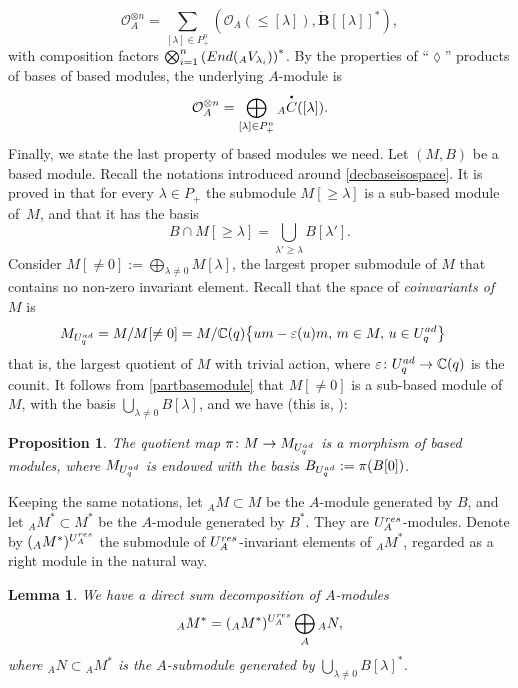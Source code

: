 \documentclass[11pt]{article}
\numberwithin{equation}{section}
\numberwithin{equation}{section}
\newtheorem{lem}[teo]{Lemma}
\newtheorem{prop}[teo]{Proposition}
\theoremstyle{definition}
\newcommand{\mc}{\mathbb{C}}
\newcommand{\Oo}{{\mathcal O}}
\newcommand{\ra}{\rightarrow}
\newcommand{\smallbullet}{%
\vcenter{\hbox{\,\scalebox{0.5}{$\bullet$}\,}}
}
\begin{document}
\begin{equation}\label{decompositionOAcoad}
\Oo_A^{\otimes n} = \sum_{[\lambda] \in P_+^n} (\Oo_A(\leq [\lambda]), \dot{\mathbf{B}} [[\lambda]]^*),
\end{equation}
with composition factors $ \bigotimes_{i=1}^n \left({\rm End}({}_A V_{\lambda_i})\right)^*$. By the properties of ``$\lozenge$'' products of bases of based modules, the underlying $A$-module is
\begin{equation}\label{decompositionOA2}
\Oo_A^{\otimes n} = \bigoplus_{[\lambda] \in P_+^n} {}_A \overset{\raisebox{-1.5pt}{\scriptsize$\smallbullet$}}{C} ([\lambda]).
\end{equation}
Finally, we state the last property of based modules we need. Let $(M,B)$ be a based module. Recall the notations introduced around \eqref{decbaseisospace}. It is proved in \cite[Proposition 27.1.8]{Lusztig} that for every $\lambda\in P_+$ the submodule $M[\geq\lambda]$ is a sub-based module of~$M$, and that it has the basis
\begin{equation}\label{partbasemodule}
B\cap M[\geq\lambda] = \bigcup_{\lambda'\geq \lambda} B[\lambda'].
\end{equation}
Consider $M[\ne 0] := \bigoplus_{\lambda\ne 0} M[\lambda]$, the largest proper submodule of $M$ that contains no non-zero invariant element. Recall that the space of {\it coinvariants of} $M$ is
\begin{align*} M_{U_q^{\rm ad}} & = M/ M[\ne 0] = M/\mc(q)\big\{um-\varepsilon(u)m, \,m\in M, \,u\in U_q^{\rm ad}\big\}
\end{align*}
that is, the largest quotient of $M$ with trivial action, where $\varepsilon\colon U_q^{\rm ad}\ra \mc(q)$ is the counit. It follows from \eqref{partbasemodule} that $M[\ne 0]$ is a sub-based module of $M$, with the basis $\bigcup_{\lambda\ne 0} B[\lambda]$, and we have (this is, \cite[Proposition~27.2.6]{Lusztig}):
\begin{prop}\label{Linvbased} The quotient map $\pi\colon M \ra M_{U_q^{\rm ad}}$ is a morphism of based modules, where $M_{U_q^{\rm ad}}$ is endowed with the basis $B_{U_q^{\rm ad}} := \pi(B[0])$.
\end{prop}
Keeping the same notations, let ${}_AM \subset M$ be the $A$-module generated by $B$, and let ${{}_AM^* \subset M^*}$ be the $A$-module generated by $B^*$. They are $U_A^{\rm res}$-modules. Denote by $({}_A M^*)^{U_A^{\rm res}}$ the submodule of $U_A^{\rm res}$-invariant elements of ${}_A M^*$, regarded as a right module in the natural way.
\begin{lem} We have a direct sum decomposition of $A$-modules
\begin{equation}\label{decompAcoinv}
{}_A M^* = ({}_A M^*)^{U_A^{\rm res}} \bigoplus_A {}_A N,
\end{equation}
where ${}_A N\subset {}_A M^*$ is the $A$-submodule generated by $\bigcup_{\lambda\ne 0} B[\lambda]^*$.
\end{lem}
\end{document}
